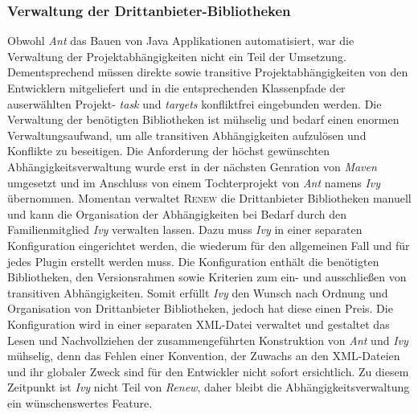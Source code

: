 		\subsubsection{Verwaltung der Drittanbieter-Bibliotheken}%
		Obwohl \textit{Ant} das Bauen von Java Applikationen automatisiert, war die Verwaltung der Projektabhängigkeiten nicht ein Teil der Umsetzung. Dementsprechend müssen direkte sowie transitive Projektabhängigkeiten von den Entwicklern mitgeliefert und in die entsprechenden Klassenpfade der auserwählten Projekt- \textit{task} und \textit{targets} konfliktfrei eingebunden werden.\newline
		Die Verwaltung der benötigten Bibliotheken ist mühselig und bedarf einen enormen Verwaltungsaufwand, um alle transitiven Abhängigkeiten aufzulösen und Konflikte zu beseitigen. Die Anforderung der höchst gewünschten Abhängigkeitsverwaltung wurde erst in der nächsten Genration von \textit{Maven} umgesetzt und im Anschluss von einem Tochterprojekt von \textit{Ant} namens \textit{Ivy} übernommen.\newline
		Momentan verwaltet \textsc{Renew} die Drittanbieter Bibliotheken manuell und kann die Organisation der Abhängigkeiten bei Bedarf durch den Familienmitglied \textit{Ivy} verwalten lassen. Dazu muss \textit{Ivy} in einer separaten Konfiguration eingerichtet werden, die wiederum für den allgemeinen Fall und für jedes Plugin erstellt werden muss. Die Konfiguration enthält die benötigten Bibliotheken, den Versionsrahmen sowie Kriterien zum ein- und ausschließen von transitiven Abhängigkeiten. \newline
		Somit erfüllt \textit{Ivy} den Wunsch nach Ordnung und Organisation von Drittanbieter Bibliotheken, jedoch hat diese einen Preis. Die Konfiguration wird in einer separaten XML-Datei verwaltet und gestaltet das Lesen und Nachvollziehen der zusammengeführten Konstruktion von \textit{Ant} und \textit{Ivy} mühselig, denn das Fehlen einer Konvention, der Zuwachs an den XML-Dateien und ihr globaler Zweck sind für den Entwickler nicht sofort ersichtlich.\newline
		Zu diesem Zeitpunkt ist \textit{Ivy} nicht Teil von \textit{Renew}, daher bleibt die Abhängigkeitsverwaltung ein wünschenswertes Feature.

